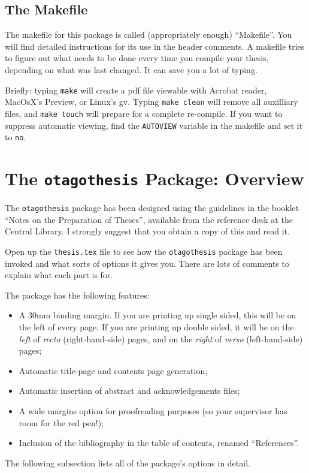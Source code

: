\subsection{The Makefile}
\label{subsec:makefile}
The makefile for this package is called (appropriately enough)
``Makefile''.  You will find detailed instructions for its use in the
header comments.  A makefile tries to figure out what needs to be done
every time you compile your thesis, depending on what was last
changed.  It can save you a lot of typing.

Briefly: typing {\tt make} will create a pdf file viewable with
Acrobat reader, MacOsX's Preview, or Linux's gv.
Typing {\tt make clean} will remove all auxilliary
files, and {\tt make touch} will prepare for a complete re-compile.
If you want to suppress automatic viewing, find the \verb|AUTOVIEW|
variable in the makefile and set it to \verb|no|.

\section{The {\tt otagothesis} Package: Overview}
\label{sec:overview}

The {\tt otagothesis} package has been designed using the guidelines in
the booklet ``Notes on the Preparation of Theses'', available from the
reference desk at the Central Library.  I strongly suggest that you
obtain a copy of this and read it.

Open up the {\tt thesis.tex} file to see how the {\tt otagothesis}
package has been invoked and what sorts of options it gives you.  There
are lots of comments to explain what each part is for.

The package has the following features:
\begin{itemize}
\item A 30mm binding margin.  If you are printing up single sided,
this will be on the left of every page.  If you are printing up double
sided, it will be on the {\em left} of {\em recto} (right-hand-side)
pages, and on the {\em right} of {\em verso} (left-hand-side) pages;
\item Automatic title-page and contents page generation;
\item Automatic insertion of abstract and acknowledgements files;
\item A wide margins option for proofreading purposes (so your
supervisor has room for the red pen!);
\item Inclusion of the bibliography in the table of contents, renamed
``References''.
\end{itemize}
The following subsection lists all of the package's options in detail. 

